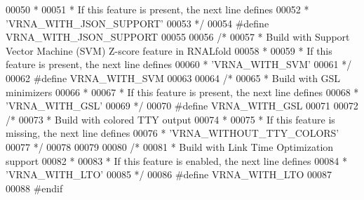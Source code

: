 \begin{DoxyCode}
00050 \textcolor{comment}{ *}
00051 \textcolor{comment}{ * If this feature is present, the next line defines}
00052 \textcolor{comment}{ * 'VRNA\_WITH\_JSON\_SUPPORT'}
00053 \textcolor{comment}{ */}
00054 \textcolor{preprocessor}{#define VRNA\_WITH\_JSON\_SUPPORT}
00055 
00056 \textcolor{comment}{/*}
00057 \textcolor{comment}{ * Build with Support Vector Machine (SVM) Z-score feature in RNALfold}
00058 \textcolor{comment}{ *}
00059 \textcolor{comment}{ * If this feature is present, the next line defines}
00060 \textcolor{comment}{ * 'VRNA\_WITH\_SVM'}
00061 \textcolor{comment}{ */}
00062 \textcolor{preprocessor}{#define VRNA\_WITH\_SVM}
00063 
00064 \textcolor{comment}{/*}
00065 \textcolor{comment}{ * Build with GSL minimizers}
00066 \textcolor{comment}{ *}
00067 \textcolor{comment}{ * If this feature is present, the next line defines}
00068 \textcolor{comment}{ * 'VRNA\_WITH\_GSL'}
00069 \textcolor{comment}{ */}
00070 \textcolor{preprocessor}{#define VRNA\_WITH\_GSL}
00071 
00072 \textcolor{comment}{/*}
00073 \textcolor{comment}{ * Build with colored TTY output}
00074 \textcolor{comment}{ *}
00075 \textcolor{comment}{ * If this feature is missing, the next line defines}
00076 \textcolor{comment}{ * 'VRNA\_WITHOUT\_TTY\_COLORS'}
00077 \textcolor{comment}{ */}
00078 
00079 
00080 \textcolor{comment}{/*}
00081 \textcolor{comment}{ * Build with Link Time Optimization support}
00082 \textcolor{comment}{ *}
00083 \textcolor{comment}{ * If this feature is enabled, the next line defines}
00084 \textcolor{comment}{ * 'VRNA\_WITH\_LTO'}
00085 \textcolor{comment}{ */}
00086 \textcolor{preprocessor}{#define VRNA\_WITH\_LTO}
00087 
00088 \textcolor{preprocessor}{#endif}
\end{DoxyCode}

